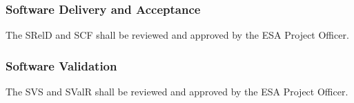 \subsubsection{Software Delivery and Acceptance}
The SRelD and SCF shall be reviewed and approved by the ESA Project Officer.

\subsubsection{Software Validation}
The SVS and SValR shall be reviewed and approved by the ESA Project Officer.



